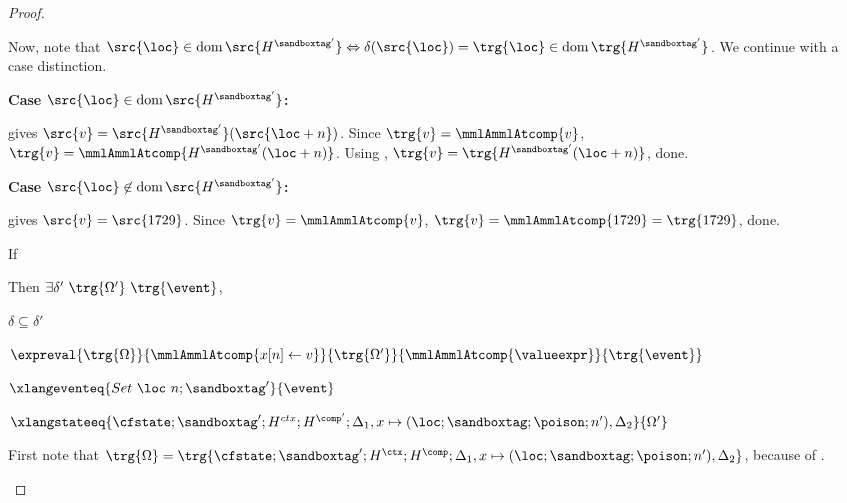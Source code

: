 \documentclass[a4paper,names,dvipsnames]{article}
\begin{document}
\begin{proof}
\begin{description}
      Now, note that $\src{\loc}\in\operatorname{dom}\src{H^{\sandboxtag'}}\Leftrightarrow\delta(\src{\loc})=\trg{\loc}\in\operatorname{dom}\trg{H^{\sandboxtag'}}$.
      We continue with a case distinction.
      \begin{description}
        \item \textbf{Case }$\src{\loc}\in\operatorname{dom}\src{H^{\sandboxtag'}}$\textbf{:}

           gives $\src{v}=\src{H^{\sandboxtag'}}(\src{\loc+n})$.
          Since $\trg{v}=\mmlAmmlAtcomp{v}$, $\trg{v}=\mmlAmmlAtcomp{H^{\sandboxtag'}(\loc+n)}$.
          Using , $\trg{v}=\trg{H^{\sandboxtag'}(\loc+n)}$, done.

        \item \textbf{Case }$\src{\loc}\not\in\operatorname{dom}\src{H^{\sandboxtag'}}$\textbf{:}

           gives $\src{v}=\src{1729}$.
          Since $\trg{v}=\mmlAmmlAtcomp{v}$, $\trg{v}=\mmlAmmlAtcomp{1729}=\trg{1729}$, done.
      \end{description}


      If
      Then $\exists\delta'\ \trg{\Omega'}\ \trg{\event}$,
      \begin{goals}
        \item $\delta\subseteq\delta'$
        \item $\expreval{\trg{\Omega}}{\mmlAmmlAtcomp{x[n]\leftarrow v}}{\trg{\Omega'}}{\mmlAmmlAtcomp{\valueexpr}}{\trg{\event}}$
        \item $\xlangeventeq{Set\ \loc\ n;\sandboxtag'}{\event}$
        \item $\xlangstateeq{\cfstate;\sandboxtag';H^{ctx};H^{\comp'};\Delta_1,x\mapsto(\loc;\sandboxtag;\poison;n'),\Delta_2}{\Omega'}$
      \end{goals}
      First note that $\trg{\Omega}=\trg{\cfstate;\sandboxtag';H^{\ctx};H^{\comp};\Delta_1,x\mapsto(\loc;\sandboxtag;\poison;n'),\Delta_2}$, because of .


\end{description}
\end{proof}
\end{document}

